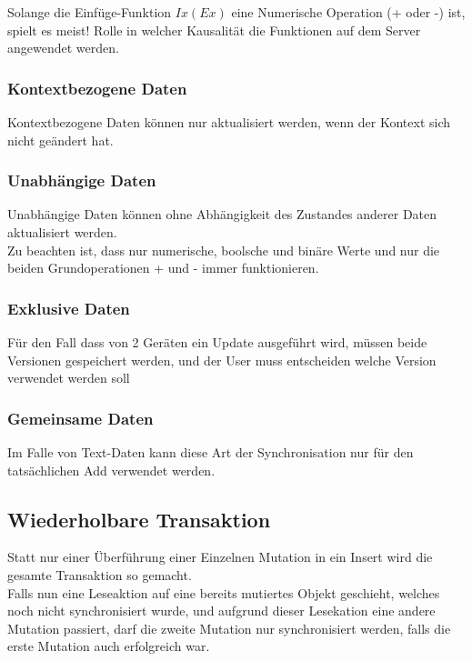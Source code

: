 \documentclass[oneside,11pt,parskip=half,ngerman]{scrreprt}
\begin{document}
Solange die Einfüge-Funktion \(Ix(Ex)\) eine Numerische Operation (+
oder -) ist, spielt es meist! Rolle in welcher Kausalität die Funktionen
auf dem Server angewendet werden.

\subsubsection{Kontextbezogene Daten}\label{kontextbezogene-daten}

Kontextbezogene Daten können nur aktualisiert werden, wenn der Kontext
sich nicht geändert hat.

\subsubsection{Unabhängige Daten}\label{unabhuxe4ngige-daten}

Unabhängige Daten können ohne Abhängigkeit des Zustandes anderer Daten
aktualisiert werden.\\Zu beachten ist, dass nur numerische, boolsche und
binäre Werte und nur die beiden Grundoperationen + und - immer
funktionieren.

\subsubsection{Exklusive Daten}\label{exklusive-daten}

Für den Fall dass von 2 Geräten ein Update ausgeführt wird, müssen beide
Versionen gespeichert werden, und der User muss entscheiden welche
Version verwendet werden soll

\subsubsection{Gemeinsame Daten}\label{gemeinsame-daten}

Im Falle von Text-Daten kann diese Art der Synchronisation nur für den
tatsächlichen Add verwendet werden.

\subsection{Wiederholbare Transaktion}\label{wiederholbare-transaktion}

Statt nur einer Überführung einer Einzelnen Mutation in ein Insert wird
die gesamte Transaktion so gemacht.\\Falls nun eine Leseaktion auf eine
bereits mutiertes Objekt geschieht, welches noch nicht synchronisiert
wurde, und aufgrund dieser Lesekation eine andere Mutation passiert,
darf die zweite Mutation nur synchronisiert werden, falls die erste
Mutation auch erfolgreich war.
\end{document}
